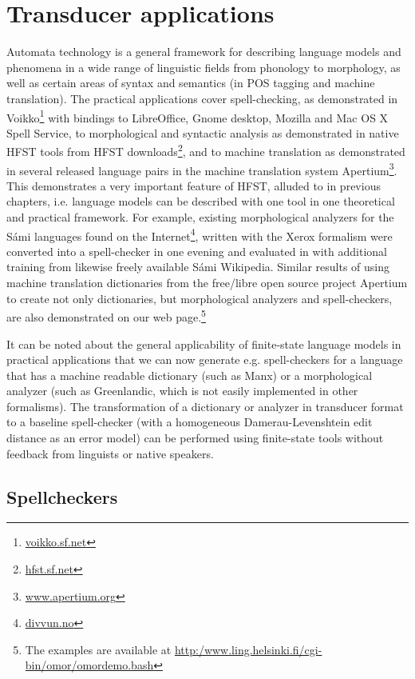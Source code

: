 \documentclass{llncs}
\begin{document}
\section{Transducer applications}\label{Applications}



Automata technology is a general framework for describing language models
and phenomena in a wide range of linguistic fields from phonology to
morphology, as well as certain areas of syntax and semantics (in POS tagging and
machine translation).  The practical applications cover spell-checking, 
as demonstrated in Voikko\footnote{\url{voikko.sf.net}} with
bindings to LibreOffice, Gnome desktop, Mozilla and Mac OS X Spell Service, to
morphological and syntactic analysis as demonstrated in native HFST tools
from HFST downloads\footnote{\url{hfst.sf.net}}, and to machine translation as demonstrated in
several released language pairs in the machine translation system
Apertium\footnote{\url{www.apertium.org}}. This demonstrates a very important feature of HFST,
alluded to in previous chapters, i.e. language models can be
described with one tool in one theoretical and practical framework. For example,
existing morphological analyzers for the Sámi languages found on the
Internet\footnote{\url{divvun.no}}, written with the Xerox formalism were converted into a spell-checker 
in one evening and evaluated in \cite{pirinen/2010/lrec} with additional training from likewise freely
available Sámi Wikipedia. Similar results of using machine translation
dictionaries from the free/libre open source project
Apertium to create not only
dictionaries, but morphological analyzers and spell-checkers, are also
demonstrated on our web page.\footnote{The examples are available at
  \url{http:/www.ling.helsinki.fi/cgi-bin/omor/omordemo.bash}}

It can be noted about the general applicability of finite-state
language models in practical applications that we can now generate
e.g. spell-checkers for a language that has a machine
readable dictionary (such as Manx) or a morphological analyzer (such as
Greenlandic, which is not easily implemented in other formalisms). 
The transformation of a dictionary or analyzer in transducer format 
to a baseline spell-checker (with a homogeneous 
Damerau-Levenshtein edit distance as an error model) can be performed using finite-state tools 
without  feedback from linguists or native speakers.

\subsection{Spellcheckers}
\end{document}
